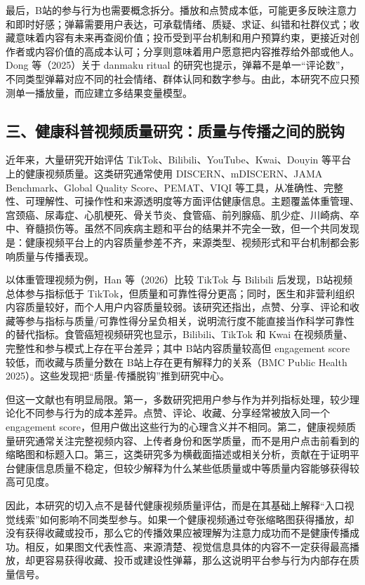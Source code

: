 \documentclass[
  12pt,
]{article}
\begin{document}
最后，B站的参与行为也需要概念拆分。播放和点赞成本低，可能更多反映注意力和即时好感；弹幕需要用户表达，可承载情绪、质疑、求证、纠错和社群仪式；收藏意味着内容有未来再查阅价值；投币受到平台机制和用户预算约束，更接近对创作者或内容价值的高成本认可；分享则意味着用户愿意把内容推荐给外部或他人。Dong
等（2025）关于 danmaku ritual
的研究也提示，弹幕不是单一``评论数''，不同类型弹幕对应不同的社会情绪、群体认同和数字参与。由此，本研究不应只预测单一播放量，而应建立多结果变量模型。

\subsection{三、健康科普视频质量研究：质量与传播之间的脱钩}\label{ux4e09ux5065ux5eb7ux79d1ux666eux89c6ux9891ux8d28ux91cfux7814ux7a76ux8d28ux91cfux4e0eux4f20ux64adux4e4bux95f4ux7684ux8131ux94a9}

近年来，大量研究开始评估 TikTok、Bilibili、YouTube、Kwai、Douyin
等平台上的健康视频质量。这类研究通常使用 DISCERN、mDISCERN、JAMA
Benchmark、Global Quality Score、PEMAT、VIQI
等工具，从准确性、完整性、可理解性、可操作性和来源透明度等方面评估健康信息。主题覆盖体重管理、宫颈癌、尿毒症、心肌梗死、骨关节炎、食管癌、前列腺癌、肌少症、川崎病、卒中、脊髓损伤等。虽然不同疾病主题和平台的结果并不完全一致，但一个共同发现是：健康视频平台上的内容质量参差不齐，来源类型、视频形式和平台机制都会影响质量与传播表现。

以体重管理视频为例，Han 等（2026）比较 TikTok 与 Bilibili
后发现，B站视频总体参与指标低于
TikTok，但质量和可靠性得分更高；同时，医生和非营利组织内容质量较好，而个人用户内容质量较弱。该研究还指出，点赞、分享、评论和收藏等参与指标与质量/可靠性得分呈负相关，说明流行度不能直接当作科学可靠性的替代指标。食管癌短视频研究也显示，Bilibili、TikTok
和 Kwai 在视频质量、完整性和参与模式上存在平台差异；其中
B站内容质量较高但 engagement score 较低，而收藏与质量分数在
B站上存在更有解释力的关系（BMC Public Health
2025）。这些发现把``质量-传播脱钩''推到研究中心。

但这一文献也有明显局限。第一，多数研究把用户参与作为并列指标处理，较少理论化不同参与行为的成本差异。点赞、评论、收藏、分享经常被放入同一个
engagement
score，但用户做出这些行为的心理含义并不相同。第二，健康视频质量研究通常关注完整视频内容、上传者身份和医学质量，而不是用户点击前看到的缩略图和标题入口。第三，这类研究多为横截面描述或相关分析，贡献在于证明平台健康信息质量不稳定，但较少解释为什么某些低质量或中等质量内容能够获得较高可见度。

因此，本研究的切入点不是替代健康视频质量评估，而是在其基础上解释``入口视觉线索''如何影响不同类型参与。如果一个健康视频通过夸张缩略图获得播放，却没有获得收藏或投币，那么它的传播效果应被理解为注意力成功而不是健康传播成功。相反，如果图文代表性高、来源清楚、视觉信息具体的内容不一定获得最高播放，却更容易获得收藏、投币或建设性弹幕，那么这说明平台参与行为内部存在质量信号。
\end{document}
